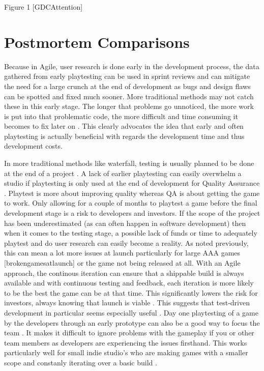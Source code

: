 \documentclass{scrartcl}
\begin{document}
\begin{center}
Figure 1 [GDCAttention]
\end{center}

\section{Postmortem Comparisons}

Because in Agile, user research is done early in the development process, the data gathered from early playtesting can be used in sprint reviews and can mitigate the need for a large crunch at the end of development as bugs and design flaws can be spotted and fixed much sooner\cite{PMKOA,}. More traditional methods may not catch these in this early stage. The longer that problems go unnoticed, the more work is put into that problematic code, the more difficult and time consuming it becomes to fix later on \cite{GDCOTC,}. This clearly advocates the idea that early and often playtesting is actually beneficial with regards the development time and thus development costs. \par
In more traditional methods like waterfall, testing is usually planned to be done at the end of a project \cite{ji2011comparing,}. A lack of earlier playtesting can easily overwhelm a studio if playtesting is only used at the end of development for Quality Assurance \cite{PMTrine,}. Playtest is more about improving quality whereas QA is about getting the game to work. Only allowing for a couple of months to playtest a game before the final development stage is a risk to developers and investors. If the scope of the project has been underestimated (as can often happen in software development) then when it comes to the testing stage, a possible lack of funds or time to adequately playtest and do user research can easily become a reality\cite{PMZZ,}. As noted previously, this can mean a lot more issues at launch particularly for large AAA games [brokengamesatlaunch] or the game not being released at all. With an Agile approach, the continous iteration can ensure that a shippable build is always available and with continuous testing and feedback, each iteration is more likely to be the best the game can be at that time. This significantly lowers the risk for investors, always knowing that launch is viable \cite{ghane2017quantitative,}. This suggests that test-driven development in particular seems especially useful \cite{cunningham2005costs,}.
Day one playtesting of a game by the developers through an early prototype can also be a good way to focus the team \cite{Yampolsky:2016:LGD:2896958.2896965,}. It makes it difficult to ignore problems with the gameplay if you or other team members as developers are experiencing the issues firsthand. This works particularly well for small indie studio's who are making games with a smaller scope and constanly iterating over a basic build \cite{PMNS2,}.
\end{document}
